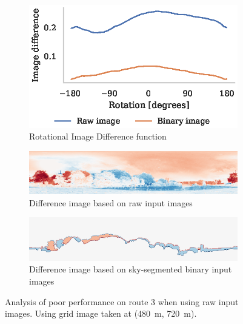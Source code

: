 \documentclass[letterpaper]{article}
\begin{document}
\begin{figure}[t]
    \begin{subfigure}[b]{\columnwidth}
        \includegraphics[width=\columnwidth]{figures/route3_ridf.eps}
        \caption{Rotational Image Difference function}
        \label{fig:light_level/ridf}
    \end{subfigure}
    
    \begin{subfigure}[b]{\columnwidth}
        \includegraphics[width=\columnwidth]{figures/route3_unwrapped_image_diff.png}
        \caption{Difference image based on raw input images}
        \label{fig:light_level/raw_image_diff}
    \end{subfigure}
    
    \begin{subfigure}[b]{\columnwidth}
        \includegraphics[width=\columnwidth]{figures/route3_mask_image_diff.png}
        \caption{Difference image based on sky-segmented binary input images}
        \label{fig:light_level/sky_segmented_image_diff}
    \end{subfigure}
    \caption{Analysis of poor performance on route 3 when using raw input images.
    Using grid image taken at (\SI{480}{\metre}, \SI{720}{\metre}).}
    \label{fig:light_level}
\end{figure}
\end{document}
